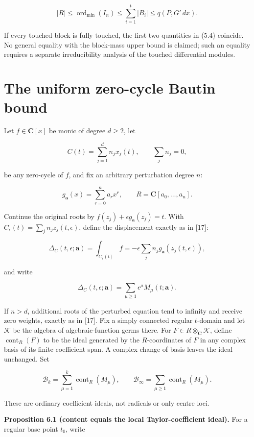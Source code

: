 \documentclass[
  11pt,
  a4paper,
]{amsart}
\begin{document}
\[
\boxed{
|R|\le \operatorname{ord}_{\min}(I_n)
\le \sum_{i=1}^t|B_i|\le q(P,G'\,dx).
}                                                        \tag{5.4}
\]

If every touched block is fully touched, the first two quantities in
(5.4) coincide. No general equality with the block-mass upper bound is
claimed; such an equality requires a separate irreducibility analysis of
the touched differential modules.

\section{The uniform zero-cycle Bautin bound}

Let \(f\in\mathbf C[x]\) be monic of degree \(d\ge2\), let

\[
C(t)=\sum_{j=1}^d n_jx_j(t),\qquad \sum_jn_j=0,
\]

be any zero-cycle of \(f\), and fix an arbitrary perturbation degree
\(n\):

\[
g_{\boldsymbol a}(x)=\sum_{r=0}^n a_rx^r,
\qquad R=\mathbf C[a_0,\ldots,a_n].
\]

Continue the original roots by
\(f(z_j)+\epsilon g_{\boldsymbol a}(z_j)=t\). With
\(C_\epsilon(t)=\sum_jn_jz_j(t,\epsilon)\), define the displacement
exactly as in {[}17{]}:

\[
\Delta_C(t,\epsilon;\boldsymbol a)
=\int_{C_\epsilon(t)}f
=-\epsilon\sum_jn_jg_{\boldsymbol a}(z_j(t,\epsilon)),
\]

and write

\[
\Delta_C(t,\epsilon;\boldsymbol a)
=\sum_{\mu\ge1}\epsilon^\mu M_\mu(t;\boldsymbol a).
\]

If \(n>d\), additional roots of the perturbed equation tend to infinity
and receive zero weights, exactly as in {[}17{]}. Fix a simply connected
regular \(t\)-domain and let \(\mathcal K\) be the algebra of
algebraic-function germs there. For
\(F\in R\otimes_{\mathbf C}\mathcal K\), define
\(\operatorname{cont}_R(F)\) to be the ideal generated by the
\(R\)-coordinates of \(F\) in any complex basis of its finite
coefficient span. A complex change of basis leaves the ideal unchanged.
Set

\[
\mathcal B_k=\sum_{\mu=1}^k\operatorname{cont}_R(M_\mu),
\qquad
\mathcal B_\infty=\sum_{\mu\ge1}\operatorname{cont}_R(M_\mu).
\]

These are ordinary coefficient ideals, not radicals or only centre loci.

\textbf{Proposition 6.1 (content equals the local Taylor-coefficient
ideal).} For a regular base point \(t_0\), write
\end{document}

